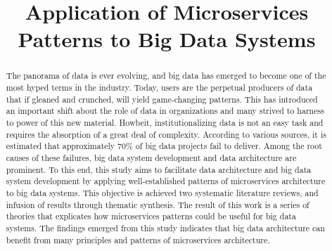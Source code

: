 \documentclass[conference]{IEEEtran}
\begin{document}
\title{Application of Microservices Patterns to Big Data Systems\\
}

\author{
\and
{}

}

\maketitle

\begin{abstract}

The panorama of data is ever evolving, and big data has emerged to become one of the most hyped terms in the industry. Today, users are the perpetual producers of data that if gleaned and crunched, will yield game-changing patterns. This has introduced an important shift about the role of data in organizations and many strived to harness to power of this new material. Howbeit, institutionalizing data is not an easy task and requires the absorption of a great deal of complexity. According to various sources, it is estimated that approximately 70\% of big data projects fail to deliver. Among the root causes of these failures, big data system development and data architecture are prominent. To this end, this study aims to facilitate data architecture and big data system development by applying well-established patterns of microservices architecture to big data systems. This objective is achieved two systematic literature reviews, and infusion of results through thematic synthesis. The result of this work is a series of theories that explicates how microservices patterns could be useful for big data systems. The findings emerged from this study indicates that big data architecture can benefit from many principles and patterns of microservices architecture. 

\end{abstract}
\end{document}

